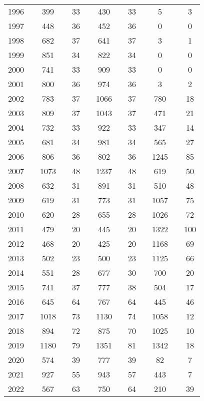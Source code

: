 \begin{table}[]
\begin{tabular}{rlclclclclclc}
1996 &  & 399 &  & 33 &  & 430 &  & 33 &  & 5 &  & 3 \\
1997 &  & 448 &  & 36 &  & 452 &  & 36 &  & 0 &  & 0 \\
1998 &  & 682 &  & 37 &  & 641 &  & 37 &  & 3 &  & 1 \\
1999 &  & 851 &  & 34 &  & 822 &  & 34 &  & 0 &  & 0 \\
2000 &  & 741 &  & 33 &  & 909 &  & 33 &  & 0 &  & 0 \\
2001 &  & 800 &  & 36 &  & 974 &  & 36 &  & 3 &  & 2 \\
2002 &  & 783 &  & 37 &  & 1066 &  & 37 &  & 780 &  & 18 \\
2003 &  & 809 &  & 37 &  & 1043 &  & 37 &  & 471 &  & 21 \\
2004 &  & 732 &  & 33 &  & 922 &  & 33 &  & 347 &  & 14 \\
2005 &  & 681 &  & 34 &  & 981 &  & 34 &  & 565 &  & 27 \\
2006 &  & 806 &  & 36 &  & 802 &  & 36 &  & 1245 &  & 85 \\
2007 &  & 1073 &  & 48 &  & 1237 &  & 48 &  & 619 &  & 50 \\
2008 &  & 632 &  & 31 &  & 891 &  & 31 &  & 510 &  & 48 \\
2009 &  & 619 &  & 31 &  & 773 &  & 31 &  & 1057 &  & 75 \\
2010 &  & 620 &  & 28 &  & 655 &  & 28 &  & 1026 &  & 72 \\
2011 &  & 479 &  & 20 &  & 445 &  & 20 &  & 1322 &  & 100 \\
2012 &  & 468 &  & 20 &  & 425 &  & 20 &  & 1168 &  & 69 \\
2013 &  & 502 &  & 23 &  & 500 &  & 23 &  & 1125 &  & 66 \\
2014 &  & 551 &  & 28 &  & 677 &  & 30 &  & 700 &  & 20 \\
2015 &  & 741 &  & 37 &  & 777 &  & 38 &  & 504 &  & 17 \\
2016 &  & 645 &  & 64 &  & 767 &  & 64 &  & 445 &  & 46 \\
2017 &  & 1018 &  & 73 &  & 1130 &  & 74 &  & 1058 &  & 12 \\
2018 &  & 894 &  & 72 &  & 875 &  & 70 &  & 1025 &  & 10 \\
2019 &  & 1180 &  & 79 &  & 1351 &  & 81 &  & 1342 &  & 18 \\
2020 &  & 574 &  & 39 &  & 777 &  & 39 &  & 82 &  & 7 \\
2021 &  & 927 &  & 55 &  & 943 &  & 57 &  & 443 &  & 7 \\
2022 &  & 567 &  & 63 &  & 750 &  & 64 &  & 210 &  & 39 \\ \hline
\end{tabular}
\end{table}
\endgroup{}
\endgroup{}
